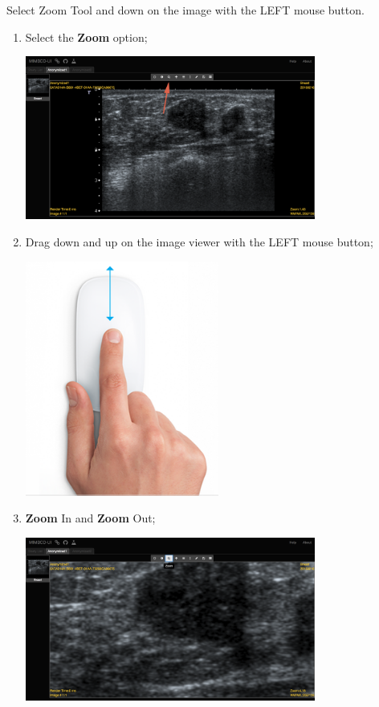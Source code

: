 \documentclass{tufte-book} %
\begin{document}
Select Zoom Tool and down on the image with the LEFT mouse button.

\begin{enumerate}

\item Select the \textbf{Zoom} option;

\begin{center}
\includegraphics[width=0.75\textwidth]{graphics/anon1_zoom_out.png}
\end{center}

\item Drag down and up on the image viewer with the LEFT mouse button;

\begin{center}
\includegraphics[width=0.50\textwidth]{graphics/mouse-up-down.png}
\end{center}

\item \textbf{Zoom} In and \textbf{Zoom} Out;

\begin{center}
\includegraphics[width=0.75\textwidth]{graphics/anon1_zoom_in.png}
\end{center}

\end{enumerate}
\end{document}
